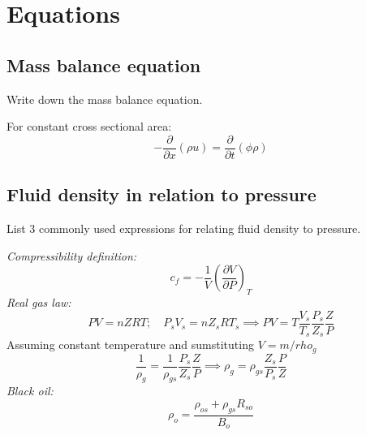 
\section{Equations} %
\label{sec:equations}

\subsection{Mass balance equation} %
\label{sub:mass_balance_equation}

\begin{question}
  Write down the mass balance equation.
\end{question}

For constant cross sectional area:
\begin{equation}
  - \frac{\partial}{\partial x} \left( \rho u \right)
  = \frac{\partial }{\partial t} \left( \phi \rho \right)
\end{equation}

\subsection{Fluid density in relation to pressure} %
\label{sub:fluid_density_in_relation_to_pressure}

\begin{question}
  List 3 commonly used expressions for relating fluid density to pressure.
\end{question}

\emph{Compressibility definition:}
\begin{equation}
  c_f = - \frac{1}{V} \left( \frac{\partial V}{\partial P} \right)_T
\end{equation}
\emph{Real gas law:}
\begin{equation}
  \nonumber
  PV = nZRT; \quad P_s V_s = n Z_s R T_s \implies PV = T \frac{V_s}{T_s} \frac{P_s}{Z_s} \frac{Z}{P}
\end{equation}
Assuming constant temperature and sumstituting $V=m/rho_g$
\begin{equation}
  \frac{1}{\rho_g} = \frac{1}{\rho_{gs}} \frac{P_s}{Z_s} \frac{Z}{P} \implies \rho_g = \rho_{gs} \frac{Z_s}{P_s} \frac{P}{Z}
\end{equation}
\emph{Black oil:}
\begin{equation}
  \rho_o = \frac{\rho_{os}+\rho_{gs}R_{so}}{B_o}
\end{equation}

